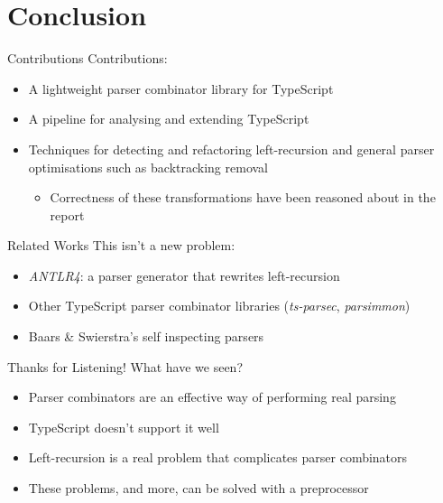 \documentclass[aspectratio=169]{beamer}
\begin{document}
    \section{Conclusion}
    \begin{frame}{Contributions}
            Contributions:
        \begin{itemize}
            \itemsep0.75em
            \item<2-> A lightweight parser combinator library for TypeScript
            \item<3-> A pipeline for analysing and extending TypeScript
            \item<4-> Techniques for detecting and refactoring left-recursion and general parser optimisations such as backtracking removal
                \begin{itemize}
                    \item Correctness of these transformations have been reasoned about in the report
                \end{itemize}
        \end{itemize}
    \end{frame}
    \begin{frame}{Related Works}
            This isn't a new problem:
        \begin{itemize}
            \itemsep0.75em
            \item<2-> \textit{ANTLR4}: a parser generator that rewrites left-recursion
            \item<3-> Other TypeScript parser combinator libraries (\textit{ts-parsec}, \textit{parsimmon})
            \item<4-> Baars \& Swierstra's self inspecting parsers
        \end{itemize}
    \end{frame}
    \begin{frame}{Thanks for Listening!}
            What have we seen?
        \begin{itemize}
            \itemsep0.75em
            \item<2-> Parser combinators are an effective way of performing real parsing
            \item<3-> TypeScript doesn't support it well
            \item<4-> Left-recursion is a real problem that complicates parser combinators
            \item<5-> These problems, and more, can be solved with a preprocessor
        \end{itemize}
    \end{frame}
\end{document}
